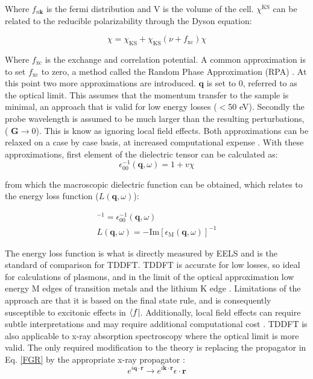 Where $f_{n\textbf{k}}$ is the fermi distribution and V is the volume of the cell.  $\chi^{\mathrm{KS}}$ can be related to the reducible polarizability through the Dyson equation:  

\begin{equation}
\chi = \chi_{\mathrm{KS}} + \chi_{\mathrm{KS}}(\nu + f_{\mathrm{xc}})\chi
\end{equation}

Where $f_{\mathrm{xc}}$ is the exchange and correlation potential.  A common approximation is to set $f_{\mathrm{xc}}$ to zero, a method called the Random Phase Approximation (RPA) \cite{optic}.  At this point two more approximations are introduced.  $\textbf{q}$  is set to 0, referred to as the optical limit.  This assumes that the momentum transfer to the sample is minimal, an approach that is valid for low energy losses ($<$50 eV).  Secondly the probe wavelength is assumed to be much larger than the resulting perturbations, ($\textbf{ G} \to 0$). This is know as ignoring local field effects.  Both approximations can be relaxed on a case by case basis, at increased computational expense \cite{exciting}. With these approximations, first element of the dielectric tensor can be calculated as: 
\begin{equation}
\epsilon_{\mathrm{00}}^{-1} (\textbf{q},\omega) =1+v \chi
\end{equation}

from which the macroscopic dielectric function can be obtained, which relates to the energy loss function ($L(\textbf{q},\omega)$): 

\begin{gather}
[\epsilon_{\mathrm{M}}(\textbf{q},\omega)]^{-1} = \epsilon_{\mathrm{00}}^{-1}(\textbf{q},\omega)\\
	L(\textbf{q},\omega) = -\mathrm{Im}[\epsilon_{\mathrm{M}}(\textbf{q},\omega)]^{-1}
\end{gather}

The energy loss function is what is directly measured by EELS and is the standard of comparison for TDDFT. TDDFT is accurate for low losses, so ideal for calculations of plasmons, and in the limit of the optical approximation low energy M edges of transition metals and the lithium K edge \cite{mauchamp_local_2008}.  Limitations of the approach are that it is based on the final state rule, and is consequently susceptible to excitonic effects in $\bra{f}$.  Additionally, local field effects can require subtle interpretations and  may require  additional  computational cost \cite{mauchamp_local_2008}.    TDDFT is also applicable to x-ray absorption spectroscopy where the optical limit is more valid.  The only required modification to the theory is replacing the propagator in Eq. \ref{FGR} by the appropriate x-ray propagator \cite{ankudinov_real-space_1998}:
\begin{equation}
e^{i\textbf{q}\cdot\textbf{r}} \to e^{i\textbf{k}\cdot\textbf{r}}\epsilon \cdot \textbf{r}
\label{x-prop}
\end{equation}

